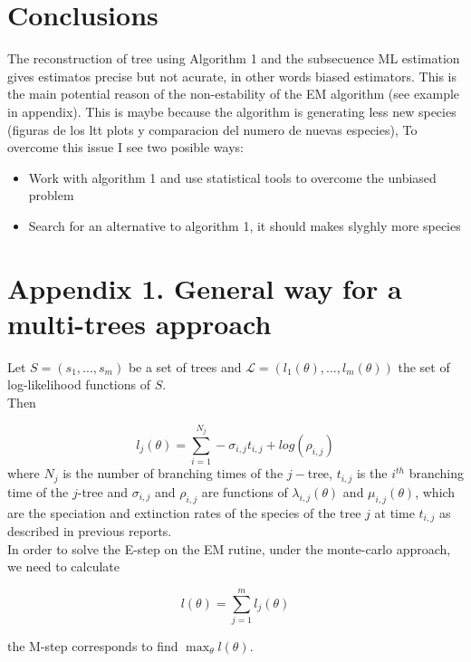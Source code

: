\documentclass[10pt,a4paper]{article}
\begin{document}
\section{Conclusions}



The reconstruction of tree using Algorithm 1 and the subsecuence ML estimation gives estimatos precise but not acurate, in other words biased estimators. This is the main potential reason of the non-estability of the EM algorithm (see example in appendix). This is maybe because the algorithm is generating less new species (figuras de los ltt plots y comparacion del numero de nuevas especies), 
To overcome this issue I see two posible ways: 

\begin{itemize}

	\item Work with algorithm 1 and use statistical tools to overcome the unbiased problem
	\item Search for an alternative to algorithm 1, it should makes slyghly more species

\end{itemize}

\section{Appendix 1. General way for a multi-trees approach}


Let $S=(s_1,...,s_m)$ be a set of trees and $ \mathcal{L} = (l_1(\theta),...,l_m(\theta))$ the set of log-likelihood functions of $S$. \\

Then 

$$ l_j(\theta) = \displaystyle\sum_{i=1}^{N_j} - \sigma_{i,j} t_{i,j}+log(\rho_{i,j}) $$
where $N_j$ is the number of branching times of the $j-$tree, $t_{i,j}$ is the $i^{th}$ branching time of the $j$-tree and $\sigma_{i,j}$ and $\rho_{i,j}$ are functions of $\lambda_{i,j}(\theta)$ and $\mu_{i,j}(\theta)$, which are the speciation and extinction rates of the species of the tree $j$ at time $t_{i,j}$ as described in previous reports.\\

In order to solve the E-step on the EM rutine, under the monte-carlo approach, we need to calculate 

$$ l(\theta) = \displaystyle\sum_{j = 1}^m l_j(\theta) $$

the M-step corresponds to find $\max_{\theta} l(\theta) $.
\end{document}
